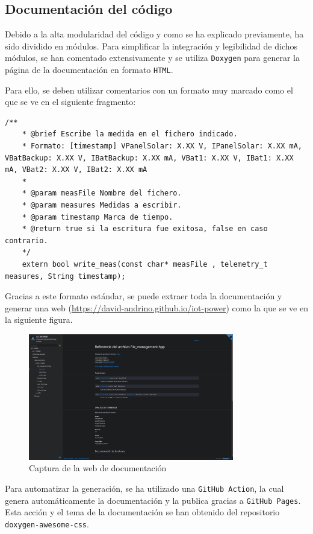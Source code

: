 \subsection{Documentación del código}

Debido a la alta modularidad del código y como se ha explicado previamente, ha sido dividido en módulos. Para simplificar la integración y legibilidad de dichos módulos, se han comentado extensivamente y se utiliza \texttt{Doxygen} para generar la página de la documentación en formato \texttt{HTML}.

Para ello, se deben utilizar comentarios con un formato muy marcado como el que se ve en el siguiente fragmento:

\begin{lstlisting}[caption={Ejemplo de comentario \texttt{Doxygen}},captionpos=b]
    /**
    * @brief Escribe la medida en el fichero indicado.
    * Formato: [timestamp] VPanelSolar: X.XX V, IPanelSolar: X.XX mA, VBatBackup: X.XX V, IBatBackup: X.XX mA, VBat1: X.XX V, IBat1: X.XX mA, VBat2: X.XX V, IBat2: X.XX mA
    * 
    * @param measFile Nombre del fichero.
    * @param measures Medidas a escribir.
    * @param timestamp Marca de tiempo.
    * @return true si la escritura fue exitosa, false en caso contrario.
    */
    extern bool write_meas(const char* measFile , telemetry_t measures, String timestamp);
\end{lstlisting}

Gracias a este formato estándar, se puede extraer toda la documentación y generar una web ({\url{https://david-andrino.github.io/iot-power}}) como la que se ve en la siguiente figura.

\begin{figure}[H]
    \centering
    \includegraphics[width=0.8\textwidth]{images/3-software/3-5-doxygen/web.png}
    \caption{Captura de la web de documentación}
\end{figure}

Para automatizar la generación, se ha utilizado una \texttt{GitHub Action}, la cual genera automáticamente la documentación y la publica gracias a \texttt{GitHub Pages}. Esta acción y el tema de la documentación se han obtenido del repositorio \texttt{doxygen-awesome-css}. \cite{jotheproJotheproDoxygenawesomecss2024}